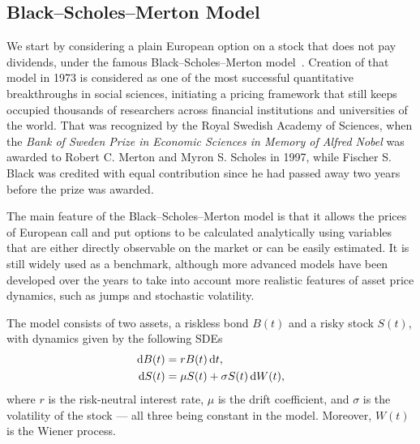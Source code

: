 \documentclass{UUThesisTemplate}
\begin{document}
%
\subsection{Black--Scholes--Merton Model}
\label{sub:bs}

\par
We start by considering a plain European option on a stock that does not pay dividends, under the famous Black--Scholes--Merton model~\cite{black73,merton73}. Creation of that model in 1973 is considered as one of the most successful quantitative breakthroughs in social sciences, initiating a pricing framework that still keeps occupied thousands of researchers across financial institutions and universities of the world. That was recognized by the Royal Swedish Academy of Sciences, when the \emph{Bank of Sweden Prize in Economic Sciences in Memory of Alfred Nobel} was awarded to Robert C. Merton and Myron S. Scholes in 1997, while Fischer S. Black was credited with equal contribution since he had passed away two years before the prize was awarded. 

\par
The main feature of the Black--Scholes--Merton model is that it allows the prices of European call and put options to be calculated analytically using variables that are either directly observable on the market or can be easily estimated. It is still widely used as a benchmark, although more advanced models have been developed over the years to take into account more realistic features of asset price dynamics, such as jumps and stochastic volatility.

\par
The model consists of two assets, a riskless bond $B(t)$ and a risky stock $S(t)$, with dynamics given by the following SDEs
\begin{align}
\dif B(t) &= r B(t) \dif t, \label{eq:bond} \\
\dif S(t) &= \mu S(t) + \sigma S(t) \dif W(t), \label{eq:stock}
\end{align}
where $r$ is the risk-neutral interest rate, $\mu$ is the drift coefficient, and $\sigma$ is the volatility of the stock --- all three being constant in the model. Moreover, $W(t)$ is the Wiener process.
\end{document}
